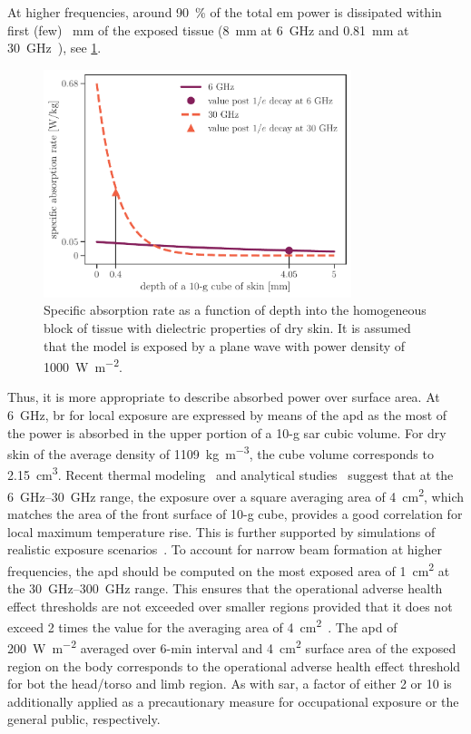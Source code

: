 At higher frequencies, around \SI{90}{\percent} of the total \gls{em} power is dissipated within first (few) \SI{}{mm} of the exposed tissue (\SI{8}{\mm} at \SI{6}{\GHz} and \SI{0.81}{\mm} at \SI{30}{\GHz}~\cite{Sasaki2017Monte}), see \cref{fig:sar_decay}.
\begin{figure}[ht]
    \centering
    \includegraphics[width=0.8\textwidth]{artwork/sar_decay.pdf}
    \caption{Specific absorption rate as a function of depth into the homogeneous block of tissue with dielectric properties of dry skin. It is assumed that the model is exposed by a plane wave with power density of \SI{1000}{\watt\per\meter\squared}.}
    \label{fig:sar_decay}
\end{figure}
Thus, it is more appropriate to describe absorbed power over surface area.
At \SI{6}{\GHz}, \gls{br} for local exposure are expressed by means of the \gls{apd} as the most of the power is absorbed in the upper portion of a 10-g \gls{sar} cubic volume.
For dry skin of the average density of \SI{1109}{\kg\per\m\cubed}, the cube volume corresponds to \SI{2.15}{\cm\cubed}.
Recent thermal modeling~\cite{Hashimoto2017On} and analytical studies~\cite{Foster2017Thermal} suggest that at the \SIrange[range-units=single,range-phrase=--]{6}{30}{\GHz} range, the exposure over a square averaging area of \SI{4}{\cm\squared}, which matches the area of the front surface of 10-g cube, provides a good correlation for local maximum temperature rise.
This is further supported by simulations of realistic exposure scenarios~\cite{He2018RF}.
To account for narrow beam formation at higher frequencies, the \gls{apd} should be computed on the most exposed area of \SI{1}{\cm\squared} at the \SIrange[range-units=single,range-phrase=--]{30}{300}{\GHz} range.
This ensures that the operational adverse health effect thresholds are not exceeded over smaller regions provided that it does not exceed 2 times the value for the averaging area of \SI{4}{\cm\squared}~\cite{Foster2016Thermal}.
The \gls{apd} of \SI{200}{\W\per\m\squared} averaged over 6-min interval and \SI{4}{\cm\squared} surface area of the exposed region on the body corresponds to the operational adverse health effect threshold for bot the head/torso and limb region.
As with \gls{sar}, a factor of either 2 or 10 is additionally applied as a precautionary measure for occupational exposure or the general public, respectively.

